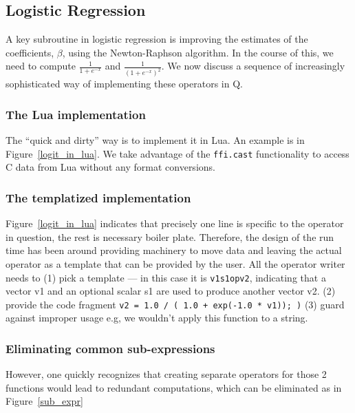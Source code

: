 \subsection{Logistic Regression}

A key subroutine in logistic regression \cite{Hastie2009} is improving the 
estimates of the
coefficients, \(\beta\), using the Newton-Raphson algorithm.
In the course of this, we need to compute
\(\frac{1}{1 + e^{-x}}\) and 
\(\frac{1}{(1 + e^{-x})^2}\).
We now discuss a sequence of increasingly sophisticated way of implementing
these operators in Q.

\subsubsection{The Lua implementation}
\label{Logit_Lua}
The ``quick and dirty'' way is to implement it in Lua. An example is 
in Figure~\ref{logit_in_lua}. We take advantage of the {\tt ffi.cast}
functionality to access C data from Lua without any format conversions.
\begin{figure}
\centering
{}
\end{figure}

\subsubsection{The templatized implementation}
\label{Logit_template}
Figure~\ref{logit_in_lua} indicates that precisely one line is specific to the
operator in question, the rest is necessary boiler plate. Therefore, the design
of the run time has been around providing machinery to move data and leaving
the actual operator as a template that can be provided by the user. All the operator
writer needs to (1) pick a template --- in this case it is {\tt v1s1opv2}, indicating that a
vector v1 and an optional scalar s1 are used to produce another vector v2.
(2) provide the code fragment {\tt  v2 = 1.0 / ( 1.0 + exp(-1.0 * v1)); )} (3)
guard against improper usage e.g, we wouldn't apply this function to a string.


\subsubsection{Eliminating common sub-expressions}
However, one quickly recognizes that creating separate operators for those 2
functions would lead to 
redundant computations, which can be eliminated as in Figure~\ref{sub_expr}

